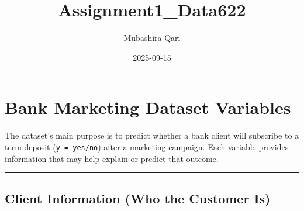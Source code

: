 \documentclass[
]{article}
\title{Assignment1\_Data622}
\author{Mubashira Qari}
\date{2025-09-15}
\begin{document}
\maketitle

{
\setcounter{tocdepth}{2}
\tableofcontents
}
\section{Bank Marketing Dataset
Variables}\label{bank-marketing-dataset-variables}

The dataset's main purpose is to predict whether a bank client will
subscribe to a term deposit (\texttt{y\ =\ yes/no}) after a marketing
campaign. Each variable provides information that may help explain or
predict that outcome.

\begin{center}\rule{0.5\linewidth}{0.5pt}\end{center}

\subsection{Client Information (Who the Customer
Is)}\label{client-information-who-the-customer-is}
\end{document}
